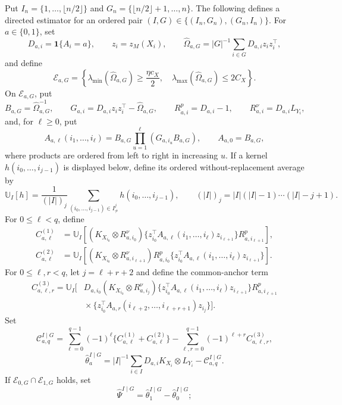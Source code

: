 Put \(I_n=\{1,\ldots,\lfloor n/2\rfloor\}\) and \(G_n=\{\lfloor n/2\rfloor+1,\ldots,n\}\).  The following defines a directed estimator for an ordered pair \((I,G)\in\{(I_n,G_n),(G_n,I_n)\}\).  For \(a\in\{0,1\}\), set
\[
 D_{a,i}=\mathbf 1\{A_i=a\},
 \qquad z_i=z_M(X_i),
 \qquad
 \widehat\Omega_{a,G}=|G|^{-1}\sum_{i\in G}D_{a,i}z_i z_i^\top,
\]
and define
\[
 \mathcal E_{a,G}=
 \left\{
  \lambda_{\min}(\widehat\Omega_{a,G})\geq\frac{\eta c_X}{2},
  \quad
  \lambda_{\max}(\widehat\Omega_{a,G})\leq2C_X
 \right\}.
\]
On \(\mathcal E_{a,G}\), put
\[
 B_{a,G}=\widehat\Omega_{a,G}^{-1},
 \qquad
 G_{a,i}=D_{a,i}z_i z_i^\top-\widehat\Omega_{a,G},
 \qquad
 R^p_{a,i}=D_{a,i}-1,
 \qquad
 R^\nu_{a,i}=D_{a,i}L_{Y_i},
\]
and, for \(\ell\geq0\), put
\[
 A_{a,\ell}(i_1,\ldots,i_\ell)
 =B_{a,G}\prod_{u=1}^{\ell}(G_{a,i_u}B_{a,G}),
 \qquad A_{a,0}=B_{a,G},
\]
where products are ordered from left to right in increasing \(u\).  If a kernel \(h(i_0,\ldots,i_{j-1})\) is displayed below, define its ordered without-replacement average by
\[
 \mathbb U_I[h]
 =\frac{1}{(|I|)_j}
   \sum_{(i_0,\ldots,i_{j-1})\in I^j_{\ne}}h(i_0,\ldots,i_{j-1}),
 \qquad (|I|)_j=|I|(|I|-1)\cdots(|I|-j+1).
\]
For \(0\leq\ell<q\), define
\[
 \begin{aligned}
 C^{(1)}_{a,\ell}
 &=\mathbb U_I\!\left[
  (K_{X_{i_0}}\otimes R^\nu_{a,i_0})
  \{z_{i_0}^\top A_{a,\ell}(i_1,\ldots,i_\ell)z_{i_{\ell+1}}\}
  R^p_{a,i_{\ell+1}}
 \right],\\
 C^{(2)}_{a,\ell}
 &=\mathbb U_I\!\left[
  (K_{X_{i_0}}\otimes R^\nu_{a,i_{\ell+1}})
  R^p_{a,i_0}
  \{z_{i_0}^\top A_{a,\ell}(i_1,\ldots,i_\ell)z_{i_{\ell+1}}\}
 \right].
 \end{aligned}
\]
For \(0\leq\ell,r<q\), let \(j=\ell+r+2\) and define the common-anchor term
\[
 \begin{aligned}
 C^{(3)}_{a,\ell,r}=\mathbb U_I\!\Big[&
 D_{a,i_0}(K_{X_{i_0}}\otimes R^\nu_{a,i_j})
 \{z_{i_0}^\top A_{a,\ell}(i_1,\ldots,i_\ell)z_{i_{\ell+1}}\}
 R^p_{a,i_{\ell+1}}\\
 &\mathrel{}\times
 \{z_{i_0}^\top A_{a,r}(i_{\ell+2},\ldots,i_{\ell+r+1})z_{i_j}\}
 \Big].
 \end{aligned}
\]
Set
\[
 \mathcal C_{a,q}^{I\mid G}
 =\sum_{\ell=0}^{q-1}(-1)^\ell
   \{C^{(1)}_{a,\ell}+C^{(2)}_{a,\ell}\}
  -\sum_{\ell,r=0}^{q-1}(-1)^{\ell+r}C^{(3)}_{a,\ell,r},
\]
\[
 \widehat\theta_a^{I\mid G}
 =|I|^{-1}\sum_{i\in I}D_{a,i}K_{X_i}\otimes L_{Y_i}
  -\mathcal C_{a,q}^{I\mid G}.
\]
If \(\mathcal E_{0,G}\cap\mathcal E_{1,G}\) holds, set
\[
 \widehat\Psi^{I\mid G}
 =\widehat\theta_1^{I\mid G}-\widehat\theta_0^{I\mid G};
\]
